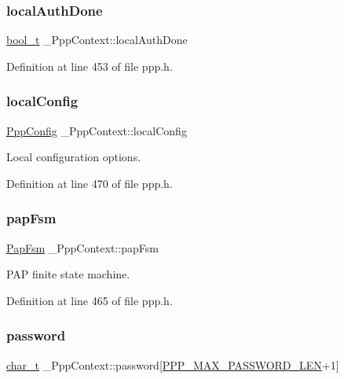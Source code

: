 \subsubsection{\texorpdfstring{local\+Auth\+Done}{localAuthDone}}
{\footnotesize\ttfamily \hyperlink{compiler__port_8h_a812d16e5494522586b3784e55d479912}{bool\+\_\+t} \+\_\+\+Ppp\+Context\+::local\+Auth\+Done}



Definition at line 453 of file ppp.\+h.

\mbox{\label{struct__PppContext_a3aecec91eee70ae46ae0dc8b346a1d52}} 
\subsubsection{\texorpdfstring{local\+Config}{localConfig}}
{\footnotesize\ttfamily \hyperlink{structPppConfig}{Ppp\+Config} \+\_\+\+Ppp\+Context\+::local\+Config}



Local configuration options. 



Definition at line 470 of file ppp.\+h.

\mbox{\label{struct__PppContext_a7472e352f3957bcd2bb8df3ef0ff1894}} 
\subsubsection{\texorpdfstring{pap\+Fsm}{papFsm}}
{\footnotesize\ttfamily \hyperlink{structPapFsm}{Pap\+Fsm} \+\_\+\+Ppp\+Context\+::pap\+Fsm}



P\+AP finite state machine. 



Definition at line 465 of file ppp.\+h.

\mbox{\label{struct__PppContext_a192649caed26a1998a818b36b706abf3}} 
\subsubsection{\texorpdfstring{password}{password}}
{\footnotesize\ttfamily \hyperlink{compiler__port_8h_a40bb5262bf908c328fbcfbe5d29d0201}{char\+\_\+t} \+\_\+\+Ppp\+Context\+::password\mbox{[}\hyperlink{ppp_8h_ad230927bc4f26aec472b73dd4e3fa46a}{P\+P\+P\+\_\+\+M\+A\+X\+\_\+\+P\+A\+S\+S\+W\+O\+R\+D\+\_\+\+L\+EN}+1\mbox{]}}



